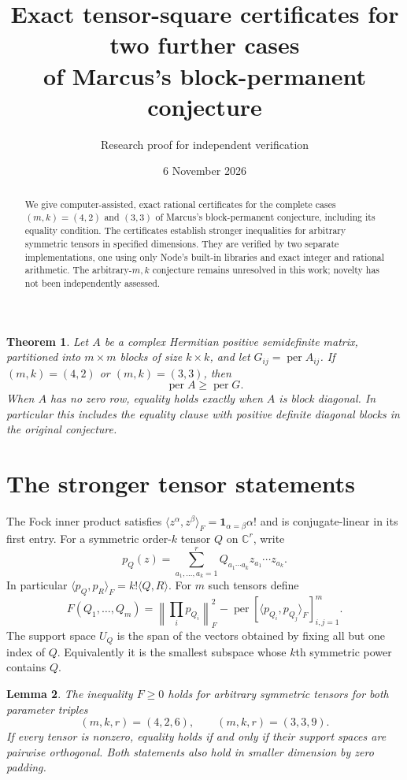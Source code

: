 \documentclass[11pt]{article}
\title{Exact tensor-square certificates for two further cases\\of Marcus's block-permanent conjecture}
\author{Research proof for independent verification}
\date{6 November 2026}
\newcommand{\per}{\operatorname{per}}
\newtheorem{theorem}{Theorem}
\newtheorem{lemma}[theorem]{Lemma}
\begin{document}
\maketitle
\begin{abstract}
We give computer-assisted, exact rational certificates for the complete cases
$(m,k)=(4,2)$ and $(3,3)$ of Marcus's block-permanent conjecture, including
its equality condition. The certificates establish stronger inequalities for
arbitrary symmetric tensors in specified dimensions. They are verified by two
separate implementations, one using only Node's built-in libraries and exact
integer and rational arithmetic. The arbitrary-$m,k$ conjecture remains
unresolved in this work; novelty has not been independently assessed.
\end{abstract}

\begin{theorem}\label{main}
Let $A$ be a complex Hermitian positive semidefinite matrix, partitioned into
$m\times m$ blocks of size $k\times k$, and let $G_{ij}=\per A_{ij}$.
If $(m,k)=(4,2)$ or $(m,k)=(3,3)$, then
\[
\per A\geq\per G.
\]
When $A$ has no zero row, equality holds exactly when $A$ is block diagonal.
In particular this includes the equality clause with positive definite diagonal
blocks in the original conjecture.
\end{theorem}

\section{The stronger tensor statements}
The Fock inner product satisfies
$\langle z^\alpha,z^\beta\rangle_F=\mathbf1_{\alpha=\beta}\alpha!$
and is conjugate-linear in its first entry. For a symmetric order-$k$ tensor
$Q$ on $\mathbb C^r$, write
\[
p_Q(z)=\sum_{a_1,\ldots,a_k=1}^r Q_{a_1\cdots a_k}z_{a_1}\cdots z_{a_k}.
\]
In particular $\langle p_Q,p_R\rangle_F=k!\langle Q,R\rangle$.
For $m$ such tensors define
\[
F(Q_1,\ldots,Q_m)=\left\|\prod_i p_{Q_i}\right\|_F^2
-\per[\langle p_{Q_i},p_{Q_j}\rangle_F]_{i,j=1}^m.
\]
The support space $U_Q$ is the span of the vectors obtained by fixing all but
one index of $Q$. Equivalently it is the smallest subspace whose $k$th
symmetric power contains $Q$.

\begin{lemma}\label{certified}
The inequality $F\geq0$ holds for arbitrary symmetric tensors for both
parameter triples
\[
(m,k,r)=(4,2,6),\qquad (m,k,r)=(3,3,9).
\]
If every tensor is nonzero, equality holds if and only if their support spaces
are pairwise orthogonal. Both statements also hold in smaller dimension by
zero padding.
\end{lemma}
\end{document}
